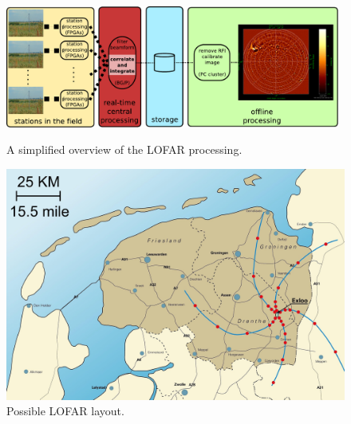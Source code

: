 \documentclass{article}
\begin{document}
\begin{figure}[t]
\begin{minipage}[b]{11cm}
\includegraphics[width=11cm]{figures/lofar-overview.pdf}
\caption{A simplified overview of the LOFAR processing.}
\label{fig:lofar-overview}
\end{minipage}
\hfill
\begin{minipage}[b]{55mm}
\includegraphics[width=\columnwidth]{figures/map.jpg}
\caption{Possible LOFAR layout.}
\label{fig:map}
\end{minipage}
\end{figure}
\end{document}
